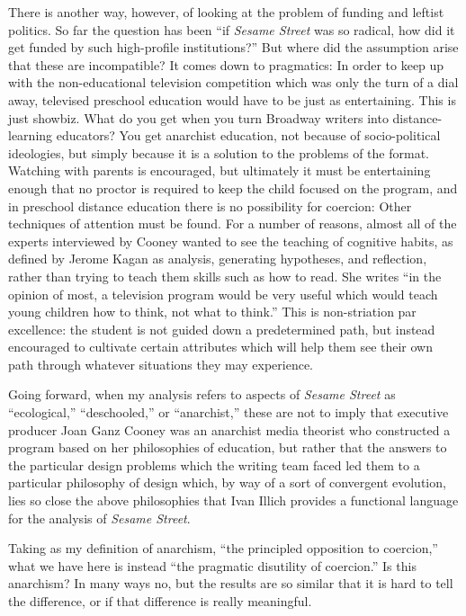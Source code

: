 \documentclass[12pt,letterpaper]{article}
\newcommand{\ses}{\textit{Sesame Street }}
\providecommand{\DIFdelbegin}{} %
\providecommand{\DIFdelend}{} %
\newcommand{\DIFscaledelfig}{0.5}
\newlength{\DIFdelgraphicswidth} %
\newlength{\DIFdelgraphicsheight} %
\newcommand{\DIFdelincludegraphics}[2][]{%
\sbox{\DIFdelgraphicsbox}{\DIFOincludegraphics[#1]{#2}}%
\settoboxwidth{\DIFdelgraphicswidth}{\DIFdelgraphicsbox} %
\settoboxtotalheight{\DIFdelgraphicsheight}{\DIFdelgraphicsbox} %
\scalebox{\DIFscaledelfig}{%
\parbox[b]{\DIFdelgraphicswidth}{\usebox{\DIFdelgraphicsbox}\\[-\baselineskip] \rule{\DIFdelgraphicswidth}{0em}}\llap{\resizebox{\DIFdelgraphicswidth}{\DIFdelgraphicsheight}{%
\setlength{\unitlength}{\DIFdelgraphicswidth}%
\begin{picture}(1,1)%
\thicklines\linethickness{2pt} %
{\color[rgb]{1,0,0}\put(0,0){\framebox(1,1){}}}%
{\color[rgb]{1,0,0}\put(0,0){\line( 1,1){1}}}%
{\color[rgb]{1,0,0}\put(0,1){\line(1,-1){1}}}%
\end{picture}%
}\hspace*{3pt}}} %
} %
\DeclareRobustCommand{\DIFdelbegin}{\DIFOdelbegin \let\includegraphics\DIFdelincludegraphics} %
\DeclareRobustCommand{\DIFdelend}{\DIFOaddend \let\includegraphics\DIFOincludegraphics} %
\begin{document}
	There is another 
	way, however, of looking at the problem of funding and leftist politics.
	So far the question has been ``if \ses was so 
	radical, how did it get funded by such high-profile institutions?'' But
	where did the assumption arise that these are incompatible? It comes 
	down to pragmatics: In order to keep up with the non-educational 
	television competition which was only the turn of a dial away, televised
	preschool education would have to be just as 
	entertaining.\autocite[38]{Cooney} This is just showbiz. What do you get
	when you turn Broadway writers into distance-learning educators? You get
	anarchist education, not because of socio-political ideologies, but 
	simply because it is a solution to the problems of the format. Watching 
	with parents is encouraged, but ultimately it must be entertaining 
	enough that no proctor is required to keep the child focused on the 
	program, and in preschool distance education there is no possibility for
	coercion: Other techniques of attention must be found. For a number of 
	reasons, almost all of the experts interviewed by Cooney wanted to see 
	the teaching of cognitive habits, as defined by Jerome Kagan as 
	analysis, generating hypotheses, and reflection, rather than trying to 
	teach them skills such as how to read. She writes 
	``in the opinion of most, a television program would be very useful 
	which would teach young children how to think, not what to 
	think.''\autocite[23]{Cooney} This is non-striation par excellence: the
	student is not guided down a 
	predetermined path, but instead encouraged to cultivate certain 
	attributes which will help them see their own path through whatever 
	situations they may experience.

	Going forward, when my analysis refers to aspects of \ses as 
	``ecological,'' ``deschooled,'' or ``anarchist,'' these are not to imply
	that executive producer Joan Ganz Cooney was an anarchist media theorist
	who 
	constructed a program based on her philosophies of education, but rather 
	that the answers to the particular design problems which the writing 
	team faced led them to a particular philosophy of design which, by way 	
	of a sort of convergent evolution, lies so close the above philosophies 
	that Ivan Illich provides a functional language for the analysis of 
	\textit{Sesame Street}.
	\DIFdelbegin %

\DIFdelend Taking as my definition of anarchism, ``the principled opposition to 
	coercion,'' what we have here is instead ``the pragmatic disutility of 
	coercion.'' Is this anarchism? In many ways no, but the results 
	are so similar that it is hard to tell the difference, or if that 
	difference is really meaningful.
\end{document}
